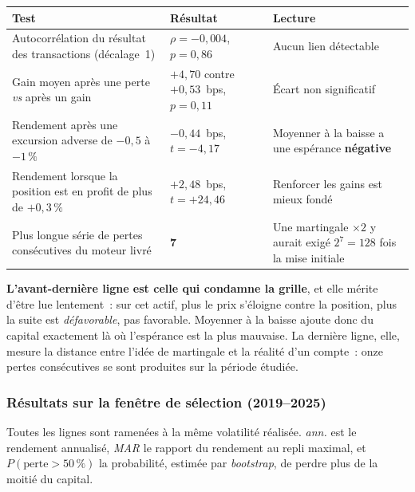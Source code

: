 \begin{center}
\renewcommand{\arraystretch}{1.3}
\small
\begin{tabular}{>{\raggedright\arraybackslash}p{7.2cm}>{\raggedright\arraybackslash}p{3.4cm}>{\raggedright\arraybackslash}p{3.8cm}}
\toprule
\textbf{Test} & \textbf{Résultat} & \textbf{Lecture} \\
\midrule
Autocorrélation du résultat des transactions (décalage~1) & $\rho = -0{,}004$, $p = 0{,}86$ & Aucun lien détectable \\
Gain moyen après une perte \emph{vs} après un gain & $+4{,}70$ contre $+0{,}53$~bps, $p = 0{,}11$ & Écart non significatif \\
Rendement après une excursion adverse de $-0{,}5$ à $-1\,\%$ & $-0{,}44$~bps, $t = -4{,}17$ & Moyenner à la baisse a une espérance \textbf{négative} \\
Rendement lorsque la position est en profit de plus de $+0{,}3\,\%$ & $+2{,}48$~bps, $t = +24{,}46$ & Renforcer les gains est mieux fondé \\
Plus longue série de pertes consécutives du moteur livré & $\mathbf{7}$ & Une martingale $\times 2$ y aurait exigé $2^{7} = 128$ fois la mise initiale \\
\bottomrule
\end{tabular}
\end{center}

\begin{insightbox}
\textbf{L'avant-dernière ligne est celle qui condamne la grille}, et elle mérite d'être lue lentement~: sur cet actif, plus le prix s'éloigne contre la position, plus la suite est \emph{défavorable}, pas favorable. Moyenner à la baisse ajoute donc du capital exactement là où l'espérance est la plus mauvaise. La dernière ligne, elle, mesure la distance entre l'idée de martingale et la réalité d'un compte~: onze pertes consécutives se sont produites sur la période étudiée.
\end{insightbox}

\subsubsection*{Résultats sur la fenêtre de sélection (2019--2025)}

Toutes les lignes sont ramenées à la même volatilité réalisée. \emph{ann.} est le rendement annualisé, \emph{MAR} le rapport du rendement au repli maximal, et $P(\text{perte} > 50\,\%)$ la probabilité, estimée par \emph{bootstrap}, de perdre plus de la moitié du capital.

